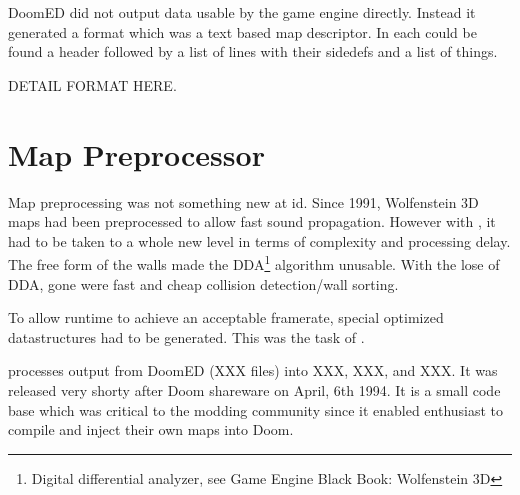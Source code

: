 DoomED did not output data usable by the game engine directly. Instead it generated a  format which was a text based map descriptor. In each  could be found a header followed by a list of lines with their sidedefs and a list of things.\\
\par
{}
\par
DETAIL FORMAT HERE.
\par
{}
\par

\pagebreak





\section{Map Preprocessor}
Map preprocessing was not something new at id. Since 1991, Wolfenstein 3D maps had been preprocessed to allow fast sound propagation. However with \doom, it had to be taken to a whole new level in terms of complexity and processing delay. The free form of the walls made the DDA\footnote{Digital differential analyzer, see Game Engine Black Book: Wolfenstein 3D} algorithm unusable. With the lose of DDA, gone were fast and cheap collision detection/wall sorting.\\
\par
To allow runtime to achieve an acceptable framerate, special optimized datastructures had to be generated. This was the task of 
.\\
\par
 processes output from DoomED (XXX files) into XXX, XXX, and XXX. It was released very shorty after Doom shareware on April, 6th 1994. It is a small code base which was critical to the modding community since it enabled enthusiast to compile and inject their own maps into Doom.\\
\par
{}
\par
{}




